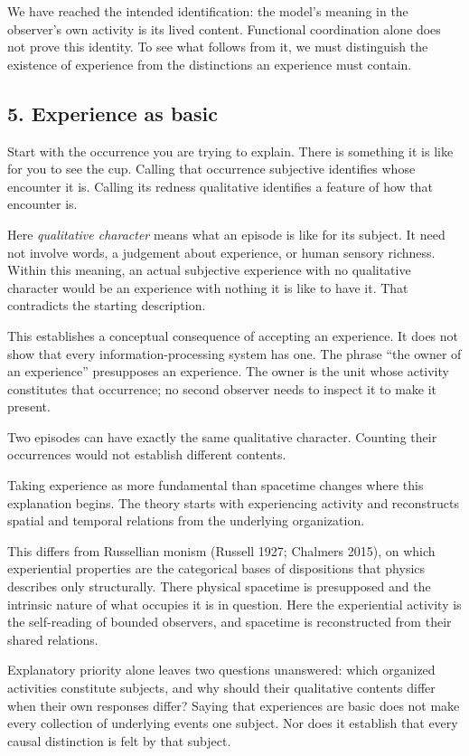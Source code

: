 \documentclass[
  11pt,
]{article}
\begin{document}
We have reached the intended identification: the model's meaning in the
observer's own activity is its lived content. Functional coordination
alone does not prove this identity. To see what follows from it, we must
distinguish the existence of experience from the distinctions an
experience must contain.

\subsection{5. Experience as basic}\label{experience-as-basic}

Start with the occurrence you are trying to explain. There is something
it is like for you to see the cup. Calling that occurrence subjective
identifies whose encounter it is. Calling its redness qualitative
identifies a feature of how that encounter is.

Here \emph{qualitative character} means what an episode is like for its
subject. It need not involve words, a judgement about experience, or
human sensory richness. Within this meaning, an actual subjective
experience with no qualitative character would be an experience with
nothing it is like to have it. That contradicts the starting
description.

This establishes a conceptual consequence of accepting an experience. It
does not show that every information-processing system has one. The
phrase ``the owner of an experience'' presupposes an experience.
The owner is the unit whose activity constitutes that occurrence; no
second observer needs to inspect it to make it present.

Two episodes can have exactly the same qualitative character. Counting
their occurrences would not establish different contents.

Taking experience as more fundamental than spacetime changes where this
explanation begins. The theory starts with experiencing activity and
reconstructs spatial and temporal relations from the underlying
organization.

This differs from Russellian monism (Russell 1927; Chalmers 2015), on
which experiential properties are the categorical bases of dispositions
that physics describes only structurally. There physical spacetime is
presupposed and the intrinsic nature of what occupies it is in question.
Here the experiential activity is the self-reading of bounded observers,
and spacetime is reconstructed from their shared relations.

Explanatory priority alone leaves two questions unanswered: which
organized activities constitute subjects, and why should their
qualitative contents differ when their own responses differ? Saying that
experiences are basic does not make every collection of underlying
events one subject. Nor does it establish that every causal distinction
is felt by that subject.
\end{document}
